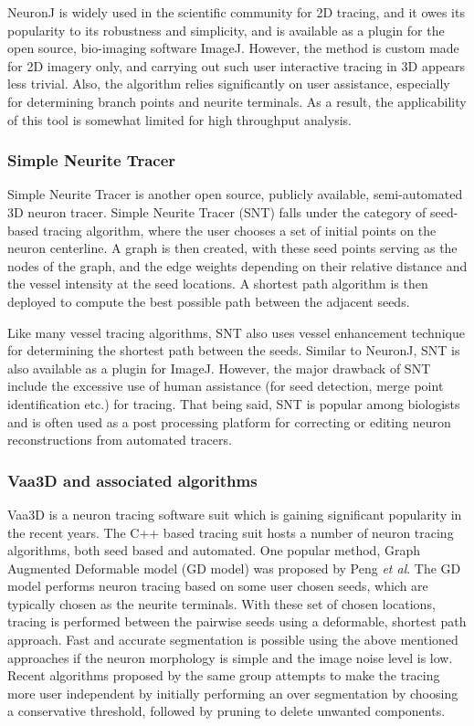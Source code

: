 NeuronJ is widely used in the scientific community for 2D tracing, and it owes its popularity to its robustness and simplicity, and is available as a plugin for the open source, bio-imaging software ImageJ\cite{imageJ}. However, the method is custom made for 2D imagery only, and carrying out such user interactive tracing in 3D appears less trivial. Also, the algorithm relies significantly on user assistance, especially for determining branch points and neurite terminals. As a result, the applicability of this tool is somewhat limited for high throughput analysis.
 
\subsubsection{Simple Neurite Tracer}
Simple Neurite Tracer\cite{SNT} is another open source, publicly available, semi-automated 3D neuron tracer.
Simple Neurite Tracer (SNT) falls under the category of seed-based tracing algorithm, where the user chooses a set of initial points on the neuron centerline. A graph is then created, with these seed points serving as the nodes of the graph, and the edge weights depending on their relative distance and the vessel intensity at the seed locations. A shortest path algorithm\cite{dijkstra1959note} is then deployed to compute the best possible path between the adjacent seeds. 

Like many vessel tracing algorithms, SNT also uses vessel enhancement technique \cite{frangi_vesselness,sato1998three} for determining the shortest path between the seeds. Similar to NeuronJ, SNT is also available as a plugin for ImageJ. However, the major drawback of SNT include the excessive use of human assistance (for seed detection, merge point identification etc.) for tracing. That being said, SNT is popular among biologists and is often used as a post processing platform for correcting or editing neuron reconstructions from automated tracers.

\subsubsection{Vaa3D and associated algorithms}
Vaa3D\cite{peng_v3d} is a neuron tracing software suit which is gaining significant popularity in the recent years. The C++ based tracing suit hosts a number of neuron tracing algorithms, both seed based and automated. One popular method, Graph Augmented Deformable model (GD model) was proposed by Peng \textit{et al}\cite{peng_GAD}. The GD model performs neuron tracing based on some user chosen seeds, which are typically chosen as the neurite terminals. With these set of chosen locations, tracing is performed between the pairwise seeds using a deformable, shortest path approach. Fast and accurate segmentation is possible using the above mentioned approaches if the neuron morphology is simple and the image noise level is low. Recent algorithms proposed by the same group \cite{peng_anisotropicPS,peng_APP} attempts to make the tracing more user independent by initially performing an over segmentation by choosing a conservative threshold, followed by pruning to delete unwanted components. 

